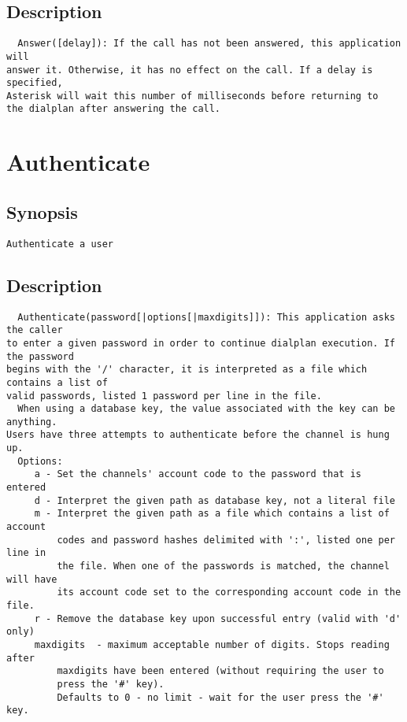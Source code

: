\subsection{Description}
\begin{verbatim}
  Answer([delay]): If the call has not been answered, this application will
answer it. Otherwise, it has no effect on the call. If a delay is specified,
Asterisk will wait this number of milliseconds before returning to
the dialplan after answering the call.

\end{verbatim}


\section{Authenticate}
\subsection{Synopsis}
\begin{verbatim}
Authenticate a user
\end{verbatim}
\subsection{Description}
\begin{verbatim}
  Authenticate(password[|options[|maxdigits]]): This application asks the caller
to enter a given password in order to continue dialplan execution. If the password
begins with the '/' character, it is interpreted as a file which contains a list of
valid passwords, listed 1 password per line in the file.
  When using a database key, the value associated with the key can be anything.
Users have three attempts to authenticate before the channel is hung up.
  Options:
     a - Set the channels' account code to the password that is entered
     d - Interpret the given path as database key, not a literal file
     m - Interpret the given path as a file which contains a list of account
         codes and password hashes delimited with ':', listed one per line in
         the file. When one of the passwords is matched, the channel will have
         its account code set to the corresponding account code in the file.
     r - Remove the database key upon successful entry (valid with 'd' only)
     maxdigits  - maximum acceptable number of digits. Stops reading after
         maxdigits have been entered (without requiring the user to
         press the '#' key).
         Defaults to 0 - no limit - wait for the user press the '#' key.

\end{verbatim}


